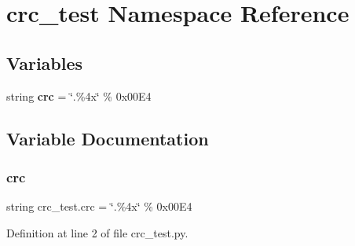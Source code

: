 \section{crc\+\_\+test Namespace Reference}
\label{namespacecrc__test}
\subsection*{Variables}
\begin{DoxyCompactItemize}
\item 
string \textbf{ crc} = \char`\"{}.\%4x\char`\"{} \% 0x00\+E4
\end{DoxyCompactItemize}


\subsection{Variable Documentation}
\mbox{\label{namespacecrc__test_ab241d7370827a6e63bcfa55bee8da695}} 
\subsubsection{crc}
{\footnotesize\ttfamily string crc\+\_\+test.\+crc = \char`\"{}.\%4x\char`\"{} \% 0x00\+E4}



Definition at line 2 of file crc\+\_\+test.\+py.


